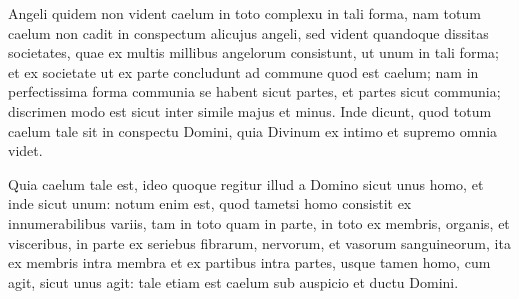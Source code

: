 \begin{topic}{62}
    Angeli quidem non vident caelum in toto complexu in tali forma, nam totum caelum non cadit in conspectum alicujus
    angeli, sed vident quandoque dissitas societates, quae ex multis millibus angelorum consistunt, ut unum in tali
    forma; et ex societate ut ex parte concludunt ad commune quod est caelum; nam in perfectissima forma communia se
    habent sicut partes, et partes sicut communia; discrimen modo est sicut inter simile majus et minus.
    Inde dicunt, quod totum caelum tale sit in conspectu Domini, quia Divinum ex intimo et supremo omnia videt.
\end{topic}

\begin{topic}{63}
    Quia caelum tale est, ideo quoque regitur illud a Domino sicut unus homo, et inde sicut unum: notum enim est, quod
    tametsi homo consistit ex innumerabilibus variis, tam in toto quam in parte, in toto ex membris, organis, et
    visceribus, in parte ex seriebus fibrarum, nervorum, et vasorum sanguineorum, ita ex membris intra membra et ex
    partibus intra partes, usque tamen homo, cum agit, sicut unus agit: tale etiam est caelum sub auspicio et ductu
    Domini.
\end{topic}

